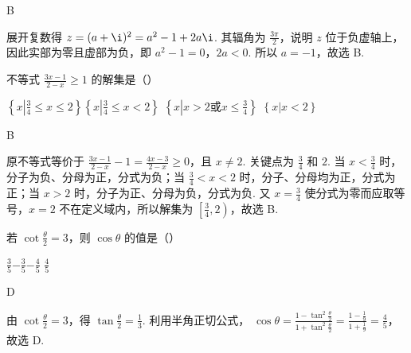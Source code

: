 \documentclass[UTF8,a4paper,oneside,11pt]{ctexbook}
\begin{document}
\begin{answer}
B
\end{answer}

\begin{solution}
展开复数得 \(z=(a+\i)^{2}=a^{2}-1+2a\i\). 其辐角为 \(\frac{3\pi}{2}\)，说明 \(z\) 位于负虚轴上，因此实部为零且虚部为负，即 \(a^{2}-1=0\)，\(2a<0\). 所以 \(a=-1\)，故选 B.
\end{solution}

\begin{problem}

不等式 \(\frac{3x-1}{2-x} \geqslant 1 \) 的解集是（\quad）

\choices
{\(\left\{x\left|\frac{3}{4}\leqslant x\leqslant2\right.\right\} \)}{\(\left\{x\left|\frac{3}{4}\leqslant x<2\right.\right\} \)}
{\(\left\{x\left|x>2 \text{或} x\leqslant\frac{3}
{4}\right.\right\} \)}
{\(\left\{x\left|x<2\right.\right\} \)}
\end{problem}

\begin{answer}
B
\end{answer}

\begin{solution}
原不等式等价于
\(\frac{3x-1}{2-x}-1=\frac{4x-3}{2-x}\geqslant0\)，且 \(x\neq2\). 关键点为 \(\frac{3}{4}\) 和 \(2\). 当 \(x<\frac{3}{4}\) 时，分子为负、分母为正，分式为负；当 \(\frac{3}{4}<x<2\) 时，分子、分母均为正，分式为正；当 \(x>2\) 时，分子为正、分母为负，分式为负. 又 \(x=\frac{3}{4}\) 使分式为零而应取等号，\(x=2\) 不在定义域内，所以解集为 \(\left[\frac{3}{4},2\right)\)，故选 B.
\end{solution}

\begin{problem}

若 \(\cot\frac{\theta}{2}=3 \)，则 \(\cos\theta \) 的值是（\quad）

\choices
{\(\frac{3}{5}\)}{\(-\frac{3}{5}\)}{\(-\frac{4}
{5}\)}
{\(\frac{4}
{5}\)}
\end{problem}

\begin{answer}
D
\end{answer}

\begin{solution}
由 \(\cot\frac{\theta}{2}=3\)，得 \(\tan\frac{\theta}{2}=\frac{1}{3}\). 利用半角正切公式，
\(\cos\theta=\frac{1-\tan^{2}\frac{\theta}{2}}{1+\tan^{2}\frac{\theta}{2}}=\frac{1-\frac{1}{9}}{1+\frac{1}{9}}=\frac{4}{5}\)，故选 D.
\end{solution}
\end{document}

